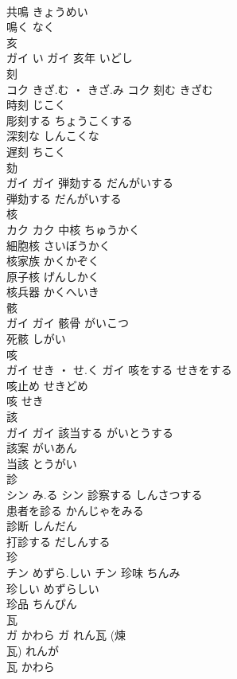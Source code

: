 \documentclass[8pt]{extreport}
\begin{document}
\begin{CJK}{UTF8}{min}
\\	共鳴	きょうめい	
\\	鳴く	なく	
\\	亥	
\\	ガイ	い	ガイ	亥年	いどし	
\\	刻	
\\	コク	きざ.む ・ きざ.み	コク	刻む	きざむ	
\\	時刻	じこく	
\\	彫刻する	ちょうこくする	
\\	深刻な	しんこくな	
\\	遅刻	ちこく	
\\	劾	
\\	ガイ		ガイ	弾劾する	だんがいする	
\\	弾劾する	だんがいする	
\\	核	
\\	カク		カク	中核	ちゅうかく	
\\	細胞核	さいぼうかく	
\\	核家族	かくかぞく	
\\	原子核	げんしかく	
\\	核兵器	かくへいき	
\\	骸	
\\	ガイ		ガイ	骸骨	がいこつ	
\\	死骸	しがい	
\\	咳	
\\	ガイ	せき ・ せ.く	ガイ	咳をする	せきをする	
\\	咳止め	せきどめ	
\\	咳	せき	
\\	該	
\\	ガイ		ガイ	該当する	がいとうする	
\\	該案	がいあん	
\\	当該	とうがい	
\\	診	
\\	シン	み.る	シン	診察する	しんさつする	
\\	患者を診る	かんじゃをみる	
\\	診断	しんだん	
\\	打診する	だしんする	
\\	珍	
\\	チン	めずら.しい	チン	珍味	ちんみ	
\\	珍しい	めずらしい	
\\	珍品	ちんぴん	
\\	瓦	
\\	ガ	かわら	ガ	れん瓦 (煉
\\	瓦)	れんが	
\\	瓦	かわら	

\end{CJK}
\end{document}
